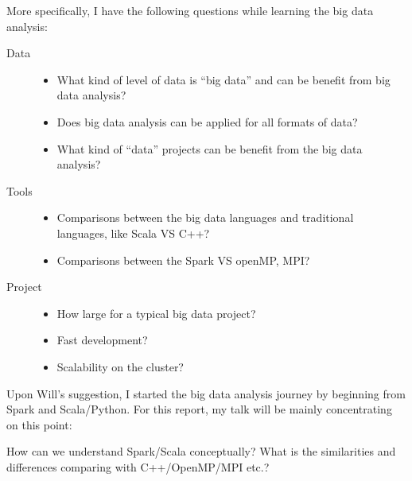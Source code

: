 \documentclass[notheorems, aspectratio=54]{beamer}
\begin{document}
\begin{frame}

More specifically, I have the following questions while learning the big data analysis:

\begin{description}
 \item [Data]
 \begin{itemize}
  \item What kind of level of data is ``big data'' and can be benefit from big data analysis?
  \item Does big data analysis can be applied for all formats of data?
  \item What kind of ``data'' projects can be benefit from the big data analysis?
 \end{itemize}
  \item [Tools]
 \begin{itemize}
  \item Comparisons between the big data languages and traditional languages, like Scala VS C++?
  \item Comparisons between the Spark VS openMP, MPI?  
 \end{itemize}
  \item [Project]
 \begin{itemize}
  \item How large for a typical big data project?
  \item Fast development?
  \item Scalability on the cluster?
 \end{itemize}
\end{description} 

\end{frame}


\begin{frame}

Upon Will's suggestion, I started the big data analysis journey by beginning from Spark and Scala/Python.
For this report, my talk will be mainly concentrating on this point:
\begin{alertblock}
 How can we understand Spark/Scala conceptually? What is the similarities and differences comparing with 
 C++/OpenMP/MPI etc.?
\end{alertblock}


\end{frame}
\end{document}
